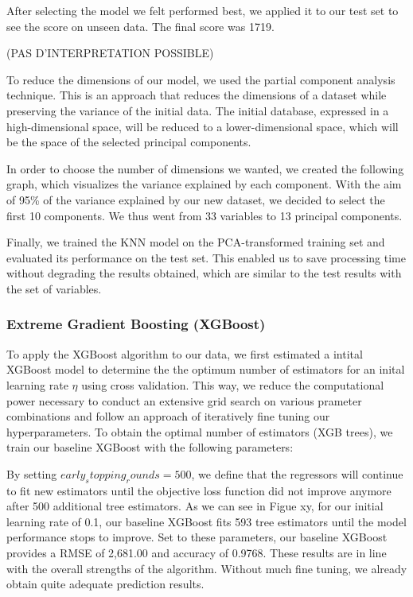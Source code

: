 \documentclass[12pt]{article}
\begin{document}
After selecting the model we felt performed best, we applied it to our test set to see the score on unseen data. The final score was 1719. 



(PAS D'INTERPRETATION POSSIBLE)

To reduce the dimensions of our model, we used the partial component analysis technique. This is an approach that reduces the dimensions of a dataset while preserving the variance of the initial data. The initial database, expressed in a high-dimensional space, will be reduced to a lower-dimensional space, which will be the space of the selected principal components. 

In order to choose the number of dimensions we wanted, we created the following graph, which visualizes the variance explained by each component. With the aim of 95\% of the variance explained by our new dataset, we decided to select the first 10 components. We thus went from 33 variables to 13 principal components. 



Finally, we trained the KNN model on the PCA-transformed training set and evaluated its performance on the test set.
This enabled us to save processing time without degrading the results obtained, which are similar to the test results with the set of variables. 


\subsubsection{Extreme Gradient Boosting (XGBoost)}
To apply the XGBoost algorithm to our data, we first estimated a intital XGBoost model to determine the the optimum number of estimators for an inital learning rate $\eta$ using cross validation. This way, we reduce the computational power necessary to conduct an extensive grid search on various prameter combinations and follow an approach of iteratively fine tuning our hyperparameters. To obtain the optimal number of estimators (XGB trees), we train our baseline XGBoost with the following parameters:

By setting $early_stopping_rounds = 500$, we define that the regressors will continue to fit new estimators until the objective loss function did not improve anymore after 500 additional tree estimators. As we can see in Figue xy, for our initial learning rate of 0.1, our baseline XGBoost fits 593 tree estimators until the model performance stops to improve. Set to these parameters, our baseline XGBoost provides a RMSE of 2,681.00 and accuracy of 0.9768. These results are in line with the overall strengths of the algorithm. Without much fine tuning, we already obtain quite adequate prediction results.
\end{document}
